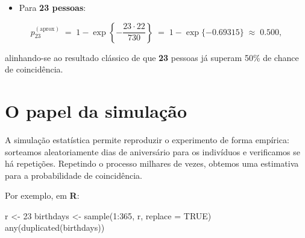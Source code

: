 \documentclass[
  letterpaper,
  DIV=11,
  numbers=noendperiod]{scrreprt}
\newenvironment{Shaded}{\begin{snugshade}}{\end{snugshade}}
\newcommand{\AttributeTok}[1]{\textcolor[rgb]{0.40,0.45,0.13}{#1}}
\newcommand{\ConstantTok}[1]{\textcolor[rgb]{0.56,0.35,0.01}{#1}}
\newcommand{\DecValTok}[1]{\textcolor[rgb]{0.68,0.00,0.00}{#1}}
\newcommand{\FunctionTok}[1]{\textcolor[rgb]{0.28,0.35,0.67}{#1}}
\newcommand{\NormalTok}[1]{\textcolor[rgb]{0.00,0.23,0.31}{#1}}
\newcommand{\OtherTok}[1]{\textcolor[rgb]{0.00,0.23,0.31}{#1}}
\newcommand{\SpecialCharTok}[1]{\textcolor[rgb]{0.37,0.37,0.37}{#1}}
\providecommand{\tightlist}{%
  \setlength{\itemsep}{0pt}\setlength{\parskip}{0pt}}\usepackage{longtable,booktabs,array}
\begin{document}
\begin{tcolorbox}[enhanced jigsaw, left=2mm, toprule=.15mm, opacityback=0, title=\textcolor{quarto-callout-warning-color}{\faExclamationTriangle}\hspace{0.5em}{Exemplo Rápido}, leftrule=.75mm, breakable, colbacktitle=quarto-callout-warning-color!10!white, coltitle=black, rightrule=.15mm, bottomtitle=1mm, toptitle=1mm, colframe=quarto-callout-warning-color-frame, colback=white, opacitybacktitle=0.6, bottomrule=.15mm, arc=.35mm, titlerule=0mm]

\begin{itemize}
\tightlist
\item
  Para \textbf{23 pessoas}:
\end{itemize}

\[p_{23}^{(\text{aprox})}
  \;=\;
  1 - \exp\!\left\{-\frac{23\cdot22}{730}\right\}
  \;=\;
  1 - \exp\!\{-0.69315\}
  \;\approx\; 0.500,\]

alinhando-se ao resultado clássico de que \textbf{23} pessoas já superam
50\% de chance de coincidência.

\end{tcolorbox}

\section*{O papel da simulação}\label{o-papel-da-simulauxe7uxe3o}


A simulação estatística permite reproduzir o experimento de forma
empírica: sorteamos aleatoriamente dias de aniversário para os
indivíduos e verificamos se há repetições. Repetindo o processo milhares
de vezes, obtemos uma estimativa para a probabilidade de coincidência.

Por exemplo, em \textbf{R}:

\begin{Shaded}
\begin{Highlighting}[]
\NormalTok{r }\OtherTok{\textless{}{-}} \DecValTok{23}
\NormalTok{birthdays }\OtherTok{\textless{}{-}} \FunctionTok{sample}\NormalTok{(}\DecValTok{1}\SpecialCharTok{:}\DecValTok{365}\NormalTok{, r, }\AttributeTok{replace =} \ConstantTok{TRUE}\NormalTok{)}
\FunctionTok{any}\NormalTok{(}\FunctionTok{duplicated}\NormalTok{(birthdays))}
\end{Highlighting}
\end{Shaded}
\end{document}
